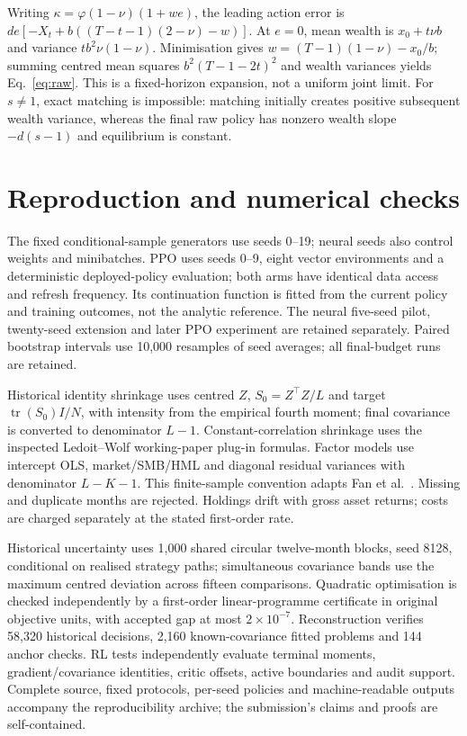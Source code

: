 \documentclass[sigconf,anonymous,review]{acmart}
\begin{document}
Writing $\kappa=\varphi(1-\nu)(1+we)$, the leading action error is $de[-X_t+b((T-t-1)(2-\nu)-w)]$. At $e=0$, mean wealth is $x_0+t\nu b $ and variance $tb^2\nu(1-\nu)$. Minimisation gives $w=(T-1)(1-\nu)-x_0/b $; summing centred mean squares $b^2(T-1-2t)^2$ and wealth variances yields Eq.~\eqref{eq:raw}. This is a fixed-horizon expansion, not a uniform joint limit. For $s\ne1$, exact matching is impossible: matching initially creates positive subsequent wealth variance, whereas the final raw policy has nonzero wealth slope $-d(s-1)$ and equilibrium is constant.

\section{Reproduction and numerical checks}\label{app:repro}
The fixed conditional-sample generators use seeds 0--19; neural seeds also control weights and minibatches. PPO uses seeds 0--9, eight vector environments and a deterministic deployed-policy evaluation; both arms have identical data access and refresh frequency. Its continuation function is fitted from the current policy and training outcomes, not the analytic reference. The neural five-seed pilot, twenty-seed extension and later PPO experiment are retained separately. Paired bootstrap intervals use 10,000 resamples of seed averages; all final-budget runs are retained.

Historical identity shrinkage uses centred $Z $, $S_0=Z^\top Z/L $ and target $\operatorname{tr}(S_0)I/N $, with intensity from the empirical fourth moment; final covariance is converted to denominator $L-1$. Constant-correlation shrinkage uses the inspected Ledoit--Wolf working-paper plug-in formulas. Factor models use intercept OLS, market/SMB/HML and diagonal residual variances with denominator $L-K-1$. This finite-sample convention adapts Fan et al.~\cite{fan2008}. Missing and duplicate months are rejected. Holdings drift with gross asset returns; costs are charged separately at the stated first-order rate.

Historical uncertainty uses 1,000 shared circular twelve-month blocks, seed 8128, conditional on realised strategy paths; simultaneous covariance bands use the maximum centred deviation across fifteen comparisons. Quadratic optimisation is checked independently by a first-order linear-programme certificate in original objective units, with accepted gap at most $2\times10^{-7}$. Reconstruction verifies 58,320 historical decisions, 2,160 known-covariance fitted problems and 144 anchor checks. RL tests independently evaluate terminal moments, gradient/covariance identities, critic offsets, active boundaries and audit support. Complete source, fixed protocols, per-seed policies and machine-readable outputs accompany the reproducibility archive; the submission's claims and proofs are self-contained.
\end{document}

